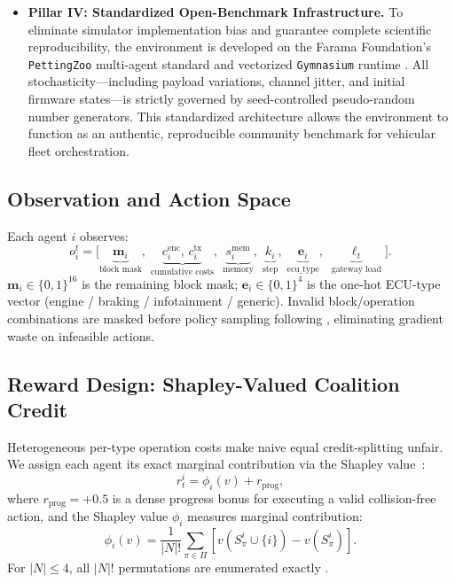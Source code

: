\documentclass[conference]{IEEEtran}
\begin{document}
\begin{itemize}[leftmargin=*]
  \item \textbf{Pillar IV: Standardized Open-Benchmark Infrastructure.}
  To eliminate simulator implementation bias and guarantee complete scientific reproducibility,
  the environment is developed on the Farama Foundation's \texttt{PettingZoo} multi-agent
  standard \cite{b9} and vectorized \texttt{Gymnasium} runtime \cite{b8}. All stochasticity—including
  payload variations, channel jitter, and initial firmware states—is strictly governed by seed-controlled
  pseudo-random number generators. This standardized architecture allows the environment to function
  as an authentic, reproducible community benchmark for vehicular fleet orchestration.
\end{itemize}

\subsection{Observation and Action Space}

Each agent $i$ observes:
\[
  o_i^t = \bigl[\underbrace{\mathbf{m}_i}_{\text{block mask}},\;
          \underbrace{c_i^{\text{enc}},\, c_i^{\text{tx}}}_{\text{cumulative costs}},\;
          \underbrace{s_i^{\text{mem}}}_{\text{memory}},\;
          \underbrace{k_i}_{\text{step}},\;
          \underbrace{\mathbf{e}_i}_{\text{ecu\_type}},\;
          \underbrace{\ell_t}_{\text{gateway load}}\bigr].
\]
$\mathbf{m}_i \in \{0,1\}^{16}$ is the remaining block mask; $\mathbf{e}_i \in
\{0,1\}^4$ is the one-hot ECU-type vector (engine / braking / infotainment / generic).
Invalid block/operation combinations are masked before policy sampling following
\cite{huang2020masking}, eliminating gradient waste on infeasible actions.

\subsection{Reward Design: Shapley-Valued Coalition Credit}
\label{sec:reward}

Heterogeneous per-type operation costs make naive equal credit-splitting unfair.
We assign each agent its exact marginal contribution via the Shapley
value~\cite{shapley1953}:
\begin{equation}
  r_t^i = \phi_i(v) + r_{\text{prog}},
  \label{eq:reward}
\end{equation}
where $r_{\text{prog}} = +0.5$ is a dense progress bonus for executing a valid
collision-free action, and the Shapley value $\phi_i$ measures marginal contribution:
\begin{equation}
  \phi_i(v) = \frac{1}{|N|!} \sum_{\pi \in \Pi}
    \left[v\!\left(S_\pi^i \cup \{i\}\right) - v\!\left(S_\pi^i\right)\right].
  \label{eq:shapley}
\end{equation}
For $|N|\le4$, all $|N|!$ permutations are enumerated exactly \cite{castro2009shapley}.
\end{document}
